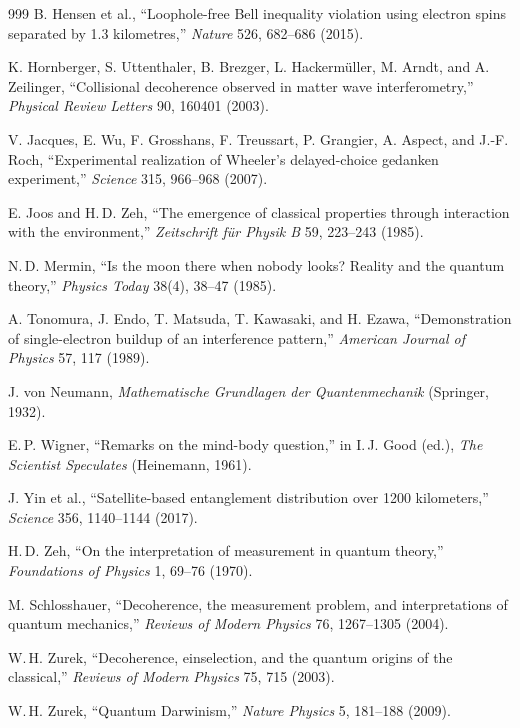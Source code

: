 \begin{thebibliography}{999}
 B. Hensen et al., ``Loophole-free Bell inequality violation using electron spins separated by 1.3 kilometres,'' \textit{Nature} 526, 682--686 (2015).

 K. Hornberger, S. Uttenthaler, B. Brezger, L. Hackerm\"uller, M. Arndt, and A. Zeilinger, ``Collisional decoherence observed in matter wave interferometry,'' \textit{Physical Review Letters} 90, 160401 (2003).

 V. Jacques, E. Wu, F. Grosshans, F. Treussart, P. Grangier, A. Aspect, and J.-F. Roch, ``Experimental realization of Wheeler's delayed-choice gedanken experiment,'' \textit{Science} 315, 966--968 (2007).

 E. Joos and H.\,D. Zeh, ``The emergence of classical properties through interaction with the environment,'' \textit{Zeitschrift f\"ur Physik B} 59, 223--243 (1985).

 N.\,D. Mermin, ``Is the moon there when nobody looks? Reality and the quantum theory,'' \textit{Physics Today} 38(4), 38--47 (1985).

 A. Tonomura, J. Endo, T. Matsuda, T. Kawasaki, and H. Ezawa, ``Demonstration of single-electron buildup of an interference pattern,'' \textit{American Journal of Physics} 57, 117 (1989).

 J. von Neumann, \textit{Mathematische Grundlagen der Quantenmechanik} (Springer, 1932).

 E.\,P. Wigner, ``Remarks on the mind-body question,'' in I.\,J. Good (ed.), \textit{The Scientist Speculates} (Heinemann, 1961).

 J. Yin et al., ``Satellite-based entanglement distribution over 1200 kilometers,'' \textit{Science} 356, 1140--1144 (2017).

 H.\,D. Zeh, ``On the interpretation of measurement in quantum theory,'' \textit{Foundations of Physics} 1, 69--76 (1970).

 M. Schlosshauer, ``Decoherence, the measurement problem, and interpretations of quantum mechanics,'' \textit{Reviews of Modern Physics} 76, 1267--1305 (2004).

 W.\,H. Zurek, ``Decoherence, einselection, and the quantum origins of the classical,'' \textit{Reviews of Modern Physics} 75, 715 (2003).

 W.\,H. Zurek, ``Quantum Darwinism,'' \textit{Nature Physics} 5, 181--188 (2009).


\end{thebibliography}
